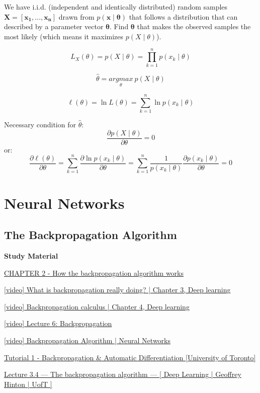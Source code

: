 \documentclass{report}
\begin{document}
We have i.i.d. (independent and identically distributed) random samples $\symbf{X} = [\symbf{x_1}, \ldots, \symbf{x_n}]$ drawn from $p(\symbf{x} \mid \symbf{\theta})$ that follows a distribution that can described by a parameter vector $\symbf{\theta}$.
Find $\symbf{\theta}$ that makes the observed samples the most likely (which means it maximizes $p(X \mid \theta)$).

\[L_X(\theta) = p(X \mid \theta) = \prod_{k=1}^{n} p(x_k \mid \theta)\]

\[\hat \theta = \underset{\theta}{argmax}\ p(X \mid \theta)\]

\[\ell(\theta) = \ln L(\theta) = \sum_{k=1}^n \ln p(x_k \mid \theta)\]

Necessary condition for $\hat \theta$:
\[\frac{\partial p(X \mid \theta)}{\partial \theta} = 0\]
or:
\[\frac{\partial \ell(\theta)}{\partial \theta} = \sum_{k=1}^n \frac{\partial \ln p(x_k \mid \theta)}{\partial \theta} = \sum_{k=1}^n \frac{1}{p(x_k \mid \theta)} \frac{\partial p(x_k \mid \theta)}{\partial \theta} = 0\]

\chapter{Neural Networks}

\section*{The Backpropagation Algorithm}

\begin{mdframed}
	\textbf{Study Material}

	\href{http://neuralnetworksanddeeplearning.com/chap2.html}{CHAPTER 2 - How the backpropagation algorithm works}

	\href{https://www.youtube.com/watch?v=Ilg3gGewQ5U&list=PLZHQObOWTQDNU6R1\_67000Dx\_ZCJB-3pi&index=3}{[video] What is backpropagation really doing? | Chapter 3, Deep learning}

	\href{https://www.youtube.com/watch?v=tIeHLnjs5U8&list=PLZHQObOWTQDNU6R1\_67000Dx\_ZCJB-3pi&index=4}{[video] Backpropagation calculus | Chapter 4, Deep learning}

	\href{https://www.youtube.com/watch?v=dB-u77Y5a6A}{[video] Lecture 6: Backpropagation}

	\href{https://www.youtube.com/watch?v=sIX\_9n-1UbM}{[video] Backpropagation Algorithm | Neural Networks}

	\href{https://www.cs.toronto.edu/~rgrosse/courses/csc2541\_2022/tutorials/tut01.pdf}{Tutorial 1 - Backpropagation \& Automatic Differentiation [University of Toronto]}

	\href{https://www.youtube.com/watch?v=VCT1N0EsGj0&list=PLLssT5z\_DsK\_gyrQ\_biidwvPYCRNGI3iv&index=14}{Lecture 3.4 — The backpropagation algorithm — [ Deep Learning | Geoffrey Hinton | UofT ]}
\end{mdframed}
\end{document}
